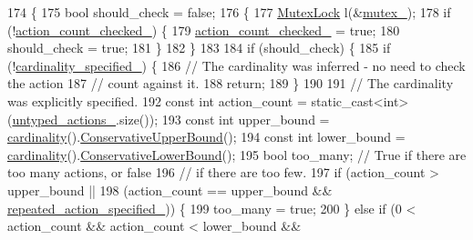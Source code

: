 \begin{DoxyCode}
174                                  \{
175   \textcolor{keywordtype}{bool} should\_check = \textcolor{keyword}{false};
176   \{
177     \hyperlink{namespacetesting_1_1internal_a08b187c6cc4e28400aadf9a32fccc8de}{MutexLock} l(&\hyperlink{classtesting_1_1internal_1_1ExpectationBase_a364f5473591d08d0ac03595c9050c13e}{mutex\_});
178     \textcolor{keywordflow}{if} (!\hyperlink{classtesting_1_1internal_1_1ExpectationBase_a19933e346f6493005437bdd6812c7a29}{action\_count\_checked\_}) \{
179       \hyperlink{classtesting_1_1internal_1_1ExpectationBase_a19933e346f6493005437bdd6812c7a29}{action\_count\_checked\_} = \textcolor{keyword}{true};
180       should\_check = \textcolor{keyword}{true};
181     \}
182   \}
183 
184   \textcolor{keywordflow}{if} (should\_check) \{
185     \textcolor{keywordflow}{if} (!\hyperlink{classtesting_1_1internal_1_1ExpectationBase_ad2ca7220ed1a395bd850ff06c500a402}{cardinality\_specified\_}) \{
186       \textcolor{comment}{// The cardinality was inferred - no need to check the action}
187       \textcolor{comment}{// count against it.}
188       \textcolor{keywordflow}{return};
189     \}
190 
191     \textcolor{comment}{// The cardinality was explicitly specified.}
192     \textcolor{keyword}{const} \textcolor{keywordtype}{int} action\_count = \textcolor{keyword}{static\_cast<}\textcolor{keywordtype}{int}\textcolor{keyword}{>}(\hyperlink{classtesting_1_1internal_1_1ExpectationBase_a9558ff6b8b1b7e3a99fac1f93d1826da}{untyped\_actions\_}.size());
193     \textcolor{keyword}{const} \textcolor{keywordtype}{int} upper\_bound = \hyperlink{classtesting_1_1internal_1_1ExpectationBase_a1399efffbc8675510a15c6ba1f18184b}{cardinality}().\hyperlink{classtesting_1_1Cardinality_acb42e3683f99b986f3ac538b5eefbc31}{ConservativeUpperBound}();
194     \textcolor{keyword}{const} \textcolor{keywordtype}{int} lower\_bound = \hyperlink{classtesting_1_1internal_1_1ExpectationBase_a1399efffbc8675510a15c6ba1f18184b}{cardinality}().\hyperlink{classtesting_1_1Cardinality_ac1785ee5c466c2524f36b9ffb5f46c79}{ConservativeLowerBound}();
195     \textcolor{keywordtype}{bool} too\_many;  \textcolor{comment}{// True if there are too many actions, or false}
196     \textcolor{comment}{// if there are too few.}
197     \textcolor{keywordflow}{if} (action\_count > upper\_bound ||
198         (action\_count == upper\_bound && \hyperlink{classtesting_1_1internal_1_1ExpectationBase_abecd382b79252ffc0779d51e058b681c}{repeated\_action\_specified\_})) \{
199       too\_many = \textcolor{keyword}{true};
200     \} \textcolor{keywordflow}{else} \textcolor{keywordflow}{if} (0 < action\_count && action\_count < lower\_bound &&

\end{DoxyCode}
